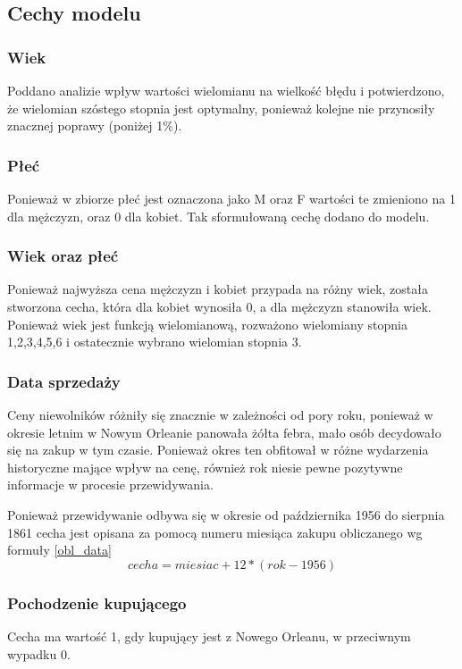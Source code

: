 \documentclass[a4paper,12pt]{article}
\begin{document}
	\subsection{Cechy modelu}
		\subsubsection{Wiek}
			Poddano analizie wpływ wartości wielomianu na wielkość błędu i potwierdzono, że wielomian szóstego stopnia jest optymalny, ponieważ kolejne nie przynosiły znacznej poprawy (poniżej 1\%).
			
		\subsubsection{Płeć}
		\label{sex}
			Ponieważ w zbiorze płeć jest oznaczona jako M oraz F wartości te zmieniono na 1 dla mężczyzn, oraz 0 dla kobiet. Tak sformułowaną cechę dodano do modelu.
		
		\subsubsection{Wiek oraz płeć}
		\label{age_sex}
			Ponieważ najwyższa cena mężczyzn i kobiet przypada na różny wiek, została stworzona cecha, która dla kobiet wynosiła 0, a dla mężczyzn stanowiła wiek. Ponieważ wiek jest funkcją wielomianową, rozważono wielomiany stopnia 1,2,3,4,5,6 i ostatecznie wybrano wielomian stopnia 3.
			
		\subsubsection{Data sprzedaży}
		\label{sale_data}
			Ceny niewolników różniły się znacznie w zależności od pory roku, ponieważ w okresie letnim w Nowym Orleanie panowała żółta febra, mało osób decydowało się na zakup w tym czasie. Ponieważ okres ten obfitował w różne wydarzenia historyczne mające wpływ na cenę, również rok niesie pewne pozytywne informacje w procesie przewidywania.
		
			Ponieważ przewidywanie odbywa się w okresie od października 1956 do sierpnia 1861 cecha jest opisana za pomocą numeru miesiąca zakupu obliczanego wg formuły \ref{obl_data}
			\begin{equation}
			cecha = miesiac + 12*(rok-1956)
				\label{obl_data}
			\end{equation}
		
		\subsubsection{Pochodzenie kupującego}
		\label{buyer_country}
			Cecha ma wartość 1, gdy kupujący jest z Nowego Orleanu, w przeciwnym wypadku 0.
		
\end{document}
